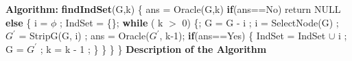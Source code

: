 \documentclass{article}
\newcommand\algo{\vspace{.10in}\textbf{Algorithm: }}
\begin{document}
\algo \newline
	\textbf {findIndSet}(G,k) \{ \newline
	\hspace*{0.5cm} ans = Oracle(G,k) \newline
	\hspace*{0.5cm} \textbf {if}(ans==No) return NULL \newline
	\hspace*{0.5cm} \textbf {else} \{ \newline
	\hspace*{1cm}		i = $\phi$ ; IndSet = \{\}; \newline
	\hspace*{1cm}		\textbf {while} ( k $>$ 0) \{; \newline
	\hspace*{1.5cm}			G = G - i ; \newline
	\hspace*{1.5cm}			i  = SelectNode(G) ; \newline
	\hspace*{1.5cm}			$G^\prime$ = StripG(G, i) ; \newline
	\hspace*{1.5cm}			ans = Oracle($G^\prime$, k-1); \newline
	\hspace*{1.5cm}			\textbf {if}(ans==Yes) \{ \newline
	\hspace*{2cm}				IndSet = IndSet $\cup$ i ; \newline
	\hspace*{2cm}				G = $G^\prime$ ; \newline
	\hspace*{2cm}				k = k - 1 ;  \newline
	\hspace*{1.5cm}			\} \newline
	\hspace*{1cm}		\} \newline
	\hspace*{0.5cm}	\} \newline
	\} \newline
\newline
\textbf {Description of the Algorithm} \newline
\end{document}
